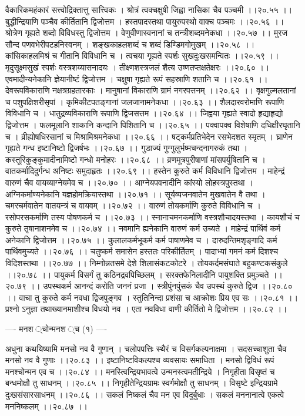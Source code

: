 \documentclass[11pt]{book}
\begin{document}
\begin{landscape}
वैकारिकमहंकारं सत्त्वोद्रिक्तात्तु सात्त्विकः ।
श्रोत्रं त्वक्चक्षुषी जिह्वा नासिका चैव पञ्चमी ।।२०.५५ ।।
बुद्धीन्द्रियाणि पञ्चैव कीर्तितानि द्विजोत्तम ।
हस्तपादस्तथा पायुरुपस्थो वाक्च पञ्चमः ।।२०.५६ ।।
श्रोत्रेण गृह्यते शब्दो विविधस्तु द्विजोत्तम ।
वेणुवीणास्वनानां च तन्त्रीशब्दमनेकधा ।।२०.५७ ।।
मुरज सौन्द पणवभेरीपटहनिस्वनम् ।
शङ्खकाहलशब्दं च शब्दं डिण्डिमगोमुखम् ।।२०.५८ ।।
कांसिकाहलमिश्रं च गीतानि विविधानि च ।
त्वचया गृह्यते स्पर्शः सुखदुःखसमन्वितः ।।२०.५९ ।।
मृदुसूक्ष्मसुखं स्पर्शः वस्त्रशय्यासनादयः ।
तीक्ष्णशस्त्रजलं शैत्य उष्णतप्तक्षतेक्षरः ।।२०.६० ।।
एवमादीन्यनेकानि ज्ञेयानीष्टं द्विजोत्तम ।
चक्षुषा गृह्यते रूपं सहस्राणि शतानि च ।।२०.६१ ।।
देवरूपविकाराणि नक्षत्रग्रहतारकाः ।
मानुषानां विकाराणि ग्रामं नगरपत्तनम् ।।२०.६२ ।।
वृक्षगुल्मलतानां च पशुपक्षिशरीसृपां ।
कृमिकीटपतङ्गानां जलजानामनेकधा ।।२०.६३ ।।
शैलदारवरोमाणि रूपाणि विविधानि च ।
धातुद्रव्यविकाराणि रूपाणि द्विजसत्तम ।।२०.६४ ।।
जिह्वया गृह्यते स्वादो हृद्याहृद्यो द्विजोत्तम ।
फलमूलानि शाकानि कन्दानि पिशितानि च ।।२०.६५ ।।
पक्वापक्व विशेषाणि दधिक्षीरघृतानि च ।
व्रीह्योषधिरसानां च मिश्रामिश्रमनेकधा ।।२०.६६ ।।
षट्कर्मप्रतिभेदेन रसभेदशत स्मृतम् ।
घ्राणेन गृह्यते गन्ध इष्टानिष्टो द्विजर्षभः ।।२०.६७ ।।
गुडाज्यं गुग्गुलुर्भष्मचन्दनागरुकं तथा ।
कस्तूरिकुङ्कुमादीनामिष्टो गन्धो मनोहरः ।।२०.६८ ।।
व्रणमूत्रपुरीषाणां मांसपर्युषितानि च ।
वातकर्मादिदुर्गन्ध अनिष्टः समुदाहृतः ।।२०.६९ ।।
हस्तेन कुरुते कर्म विविधानि द्विजोत्तम ।
माहेन्द्रं वारुणं चैव वायव्याग्नेयमेव च ।।२०.७० ।।
आग्नेयपवनादीनि कांस्यो लोहस्त्रपुस्तथा ।
अग्निकर्माण्यनेकानि यज्ञहोमक्रियास्तथा ।।२०.७१ ।।
सूर्यव्यजनवातेन मुखवातेन वै तथा ।
चमरचर्मवातेन वातयन्त्रं च वायवम् ।।२०.७२ ।।
वारुणं तोयकर्माणि कुरुते विविधानि च ।
रसोपरसकर्माणि तस्य पोषणकर्म च ।।२०.७३ ।।
स्नानाचमनकर्माणि वस्त्रशौचादयस्तथा ।
कायशौचं च कुरुते तृषानाशनमेव च ।।२०.७४ ।।
नवमानि ह्यनेकानि वारुणं कर्म उच्यते ।
माहेन्द्रं पार्थिवं कर्म अनेकानि द्विजोत्तम ।।२०.७५ ।।
कुलालकर्मभूकर्म कर्म पाषाणमेव च ।
दारुदन्तिमशृङ्गादि कर्म पार्थिवमुच्यते ।।२०.७६ ।।
चतुष्कर्म समासेन हस्ततः परिकीर्तितम् ।
पादाभ्यां गमनं कर्म दिशश्च विदिशस्तथा ।।२०.७७ ।।
निम्नोन्नतसमे देशे शिलासंकटकोटरे ।
तोयकर्दमसंघाते बहुकण्टकसंकुले ।।२०.७८ ।।
पायुकर्म विसर्गं तु कठिनद्रवपिच्छिलम् ।
सरक्तफेनिलादीनि पायुशक्ति प्रमुञ्चते ।।२०.७९ ।।
उपस्थकर्म आनन्दं करोति जननं प्रजा ।
स्त्रीपुंनपुंसकं चैव उपस्थं कुरुते द्विज ।।२०.८० ।।
वाचा तु कुरुते कर्म नवधा द्विजपुङ्गव ।
स्तुतिनिन्दा प्रशंसा च आक्रोशः प्रिय एव सः ।।२०.८१ ।।
प्रश्नो ऽनुज्ञा तथाख्यानमाशीश्च विधयो नव ।
एता नवविधा वाणी कीर्तितो मे द्विजोत्तम ।।२०.८२ ।।

---- मनश{ }्चोन्मनश{ }्च (१) ----

अधुना कथयिष्यामि मनसो नव वै गुणान् ।
चलोपपत्तिः स्थैरं च विसर्गकल्पनाक्षमा ।
सदसच्चाशुता चैव मनसो नव वै गुणाः ।।२०.८३ ।।
इष्टानिष्टविकल्पश्च व्यवसायः समाधिता ।
मनसो द्विविधं रूपं मनश्चोन्मन एव च ।।२०.८४ ।।
मनस्त्विन्द्रियभावत्वे उन्मनस्त्वमतीन्द्रिये ।
निगृहीता विसृष्तं च बन्धमोक्षौ तु साधनम् ।।२०.८५ ।।
निगृहीतेन्द्रियग्रामः स्वर्गमोक्षौ तु साधनम् ।
विसृष्टे इन्द्रियग्रामे दुःखसंसारसाधनम् ।।२०.८६ ।।
सकलं निष्कलं चैव मन एव विदुर्बुधाः ।
सकलं मननानात्वे एकत्वे मननिष्कलम् ।।२०.८७ ।।


\end{landscape}
\end{document}
